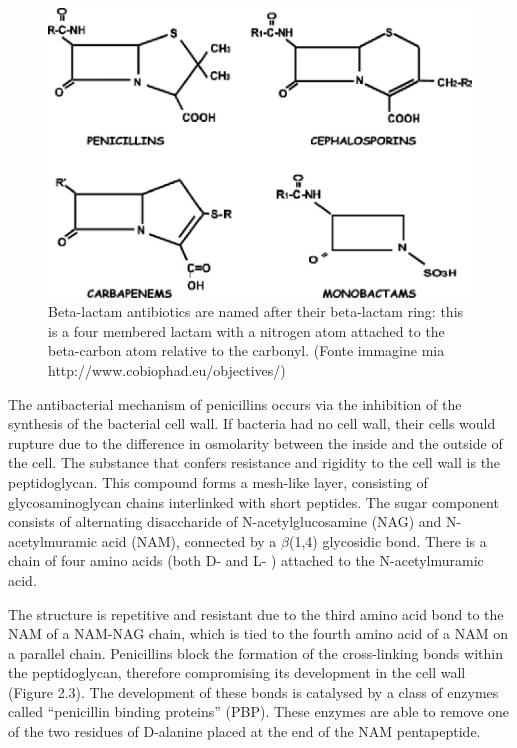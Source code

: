 \documentclass[11pt]{report}
\begin{document}
\clearpage
\begin{figure}[htp]
\centering
\includegraphics[scale=0.35]{immagini gamalero/beta_lacatams.jpg}
\caption{Beta-lactam antibiotics are named after their beta-lactam ring: this is a four membered lactam with a nitrogen atom attached to the beta-carbon atom relative to the carbonyl. (Fonte immagine mia http://www.cobiophad.eu/objectives/)}
\label{}
\end{figure}

The antibacterial mechanism of penicillins occurs via the inhibition of the synthesis of the bacterial cell wall.
If bacteria had no cell wall, their cells would rupture due to the difference in osmolarity between the inside and the outside of the cell.
The substance that confers resistance and rigidity to the cell wall is the peptidoglycan.
This compound forms a mesh-like layer, consisting of glycosaminoglycan chains interlinked with short peptides.
The sugar component consists of alternating disaccharide of N-acetylglucosamine (NAG) and N-acetylmuramic acid (NAM), connected by a $\beta$(1,4) glycosidic bond.
There is a chain of four amino acids (both D- and L- ) attached to the N-acetylmuramic acid.

The structure is repetitive and resistant due to the third amino acid bond to the NAM of a NAM-NAG chain, which is tied to the fourth amino acid of a NAM on a parallel chain.
Penicillins block the formation of the cross-linking bonds within the peptidoglycan, therefore compromising its development in the cell wall (Figure 2.3).
The development of these bonds is catalysed by a class of enzymes called “penicillin binding proteins” (PBP).
These enzymes are able to remove one of the two residues of D-alanine placed at the end of the NAM pentapeptide.
\end{document}
